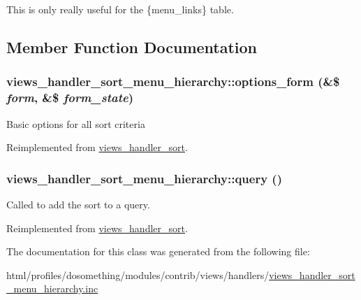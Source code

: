 This is only really useful for the \{menu\_\-links\} table. 

\subsection{Member Function Documentation}
\hypertarget{classviews__handler__sort__menu__hierarchy_a845b181c31d1e5e0da9a99663ad195e3}{
\subsubsection[{options\_\-form}]{\setlength{\rightskip}{0pt plus 5cm}views\_\-handler\_\-sort\_\-menu\_\-hierarchy::options\_\-form (\&\$ {\em form}, \/  \&\$ {\em form\_\-state})}}
\label{classviews__handler__sort__menu__hierarchy_a845b181c31d1e5e0da9a99663ad195e3}
Basic options for all sort criteria 

Reimplemented from \hyperlink{classviews__handler__sort_aba953218e09ab9da8f6ed0a67f046455}{views\_\-handler\_\-sort}.\hypertarget{classviews__handler__sort__menu__hierarchy_a04fd6337ac7ec486789586b65cf545fd}{
\subsubsection[{query}]{\setlength{\rightskip}{0pt plus 5cm}views\_\-handler\_\-sort\_\-menu\_\-hierarchy::query ()}}
\label{classviews__handler__sort__menu__hierarchy_a04fd6337ac7ec486789586b65cf545fd}
Called to add the sort to a query. 

Reimplemented from \hyperlink{classviews__handler__sort_a94fa33c5d037e41a927583fce2df3d18}{views\_\-handler\_\-sort}.

The documentation for this class was generated from the following file:\begin{DoxyCompactItemize}
\item 
html/profiles/dosomething/modules/contrib/views/handlers/\hyperlink{views__handler__sort__menu__hierarchy_8inc}{views\_\-handler\_\-sort\_\-menu\_\-hierarchy.inc}\end{DoxyCompactItemize}
